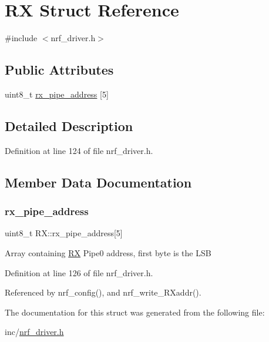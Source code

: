 \hypertarget{struct_r_x}{}\section{RX Struct Reference}
\label{struct_r_x}


{\ttfamily \#include $<$nrf\+\_\+driver.\+h$>$}

\subsection*{Public Attributes}
\begin{DoxyCompactItemize}
\item 
uint8\+\_\+t \hyperlink{struct_r_x_a450d4bb6c6e98068a74d727e126f859a}{rx\+\_\+pipe\+\_\+address} \mbox{[}5\mbox{]}
\end{DoxyCompactItemize}


\subsection{Detailed Description}


Definition at line 124 of file nrf\+\_\+driver.\+h.



\subsection{Member Data Documentation}
\mbox{\label{struct_r_x_a450d4bb6c6e98068a74d727e126f859a}} 
\subsubsection{\texorpdfstring{rx\+\_\+pipe\+\_\+address}{rx\_pipe\_address}}
{\footnotesize\ttfamily uint8\+\_\+t R\+X\+::rx\+\_\+pipe\+\_\+address\mbox{[}5\mbox{]}}

Array containing \hyperlink{struct_r_x}{RX} Pipe0 address, first byte is the L\+SB 

Definition at line 126 of file nrf\+\_\+driver.\+h.



Referenced by nrf\+\_\+config(), and nrf\+\_\+write\+\_\+\+R\+Xaddr().



The documentation for this struct was generated from the following file\+:\begin{DoxyCompactItemize}
\item 
inc/\hyperlink{nrf__driver_8h}{nrf\+\_\+driver.\+h}\end{DoxyCompactItemize}
